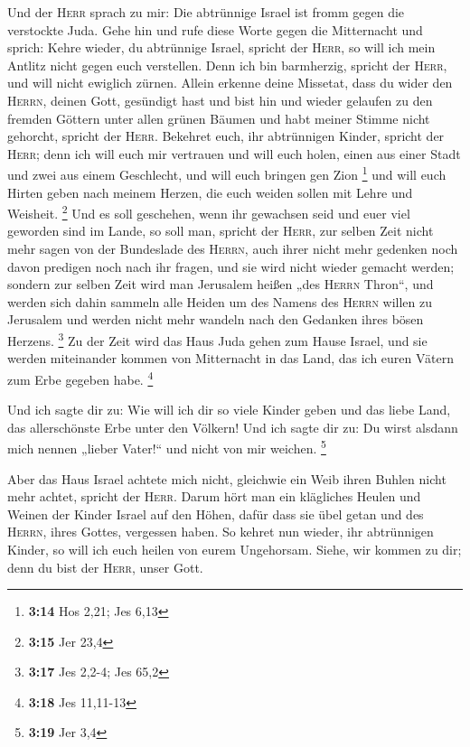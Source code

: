  Und der \textsc{Herr} sprach zu mir: Die abtrünnige
Israel ist fromm gegen die verstockte Juda.  Gehe hin und
rufe diese Worte gegen die Mitternacht und sprich: Kehre wieder, du
abtrünnige Israel, spricht der \textsc{Herr}, so will ich mein Antlitz
nicht gegen euch verstellen. Denn ich bin barmherzig, spricht der
\textsc{Herr}, und will nicht ewiglich zürnen.  Allein
erkenne deine Missetat, dass du wider den \textsc{Herrn}, deinen Gott,
gesündigt hast und bist hin und wieder gelaufen zu den fremden Göttern
unter allen grünen Bäumen und habt meiner Stimme nicht gehorcht, spricht
der \textsc{Herr}.  Bekehret euch, ihr abtrünnigen
Kinder, spricht der \textsc{Herr}; denn ich will euch mir vertrauen und
will euch holen, einen aus einer Stadt und zwei aus einem Geschlecht,
und will euch bringen gen Zion \footnote{\textbf{3:14} Hos 2,21; Jes
  6,13}  und will euch Hirten geben nach meinem Herzen,
die euch weiden sollen mit Lehre und Weisheit. \footnote{\textbf{3:15}
  Jer 23,4}  Und es soll geschehen, wenn ihr gewachsen
seid und euer viel geworden sind im Lande, so soll man, spricht der
\textsc{Herr}, zur selben Zeit nicht mehr sagen von der Bundeslade des
\textsc{Herrn}, auch ihrer nicht mehr gedenken noch davon predigen noch
nach ihr fragen, und sie wird nicht wieder gemacht werden;
 sondern zur selben Zeit wird man Jerusalem heißen „des
\textsc{Herrn} Thron``, und werden sich dahin sammeln alle Heiden um des
Namens des \textsc{Herrn} willen zu Jerusalem und werden nicht mehr
wandeln nach den Gedanken ihres bösen Herzens. \footnote{\textbf{3:17}
  Jes 2,2-4; Jes 65,2}  Zu der Zeit wird das Haus Juda
gehen zum Hause Israel, und sie werden miteinander kommen von
Mitternacht in das Land, das ich euren Vätern zum Erbe gegeben habe.
\footnote{\textbf{3:18} Jes 11,11-13}

 Und ich sagte dir zu: Wie will ich dir so viele Kinder
geben und das liebe Land, das allerschönste Erbe unter den Völkern! Und
ich sagte dir zu: Du wirst alsdann mich nennen „lieber Vater!{}`` und
nicht von mir weichen. \footnote{\textbf{3:19} Jer 3,4}

 Aber das Haus Israel achtete mich nicht, gleichwie ein
Weib ihren Buhlen nicht mehr achtet, spricht der \textsc{Herr}.
 Darum hört man ein klägliches Heulen und Weinen der
Kinder Israel auf den Höhen, dafür dass sie übel getan und des
\textsc{Herrn}, ihres Gottes, vergessen haben.  So kehret
nun wieder, ihr abtrünnigen Kinder, so will ich euch heilen von eurem
Ungehorsam. Siehe, wir kommen zu dir; denn du bist der \textsc{Herr},
unser Gott.

